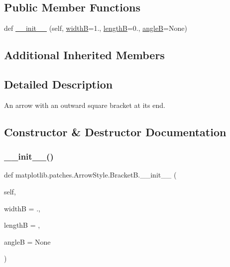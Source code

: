 \subsection*{Public Member Functions}
\begin{DoxyCompactItemize}
\item 
def \hyperlink{classmatplotlib_1_1patches_1_1ArrowStyle_1_1BracketB_a36e5298c1d28047970239880812fbf02}{\+\_\+\+\_\+init\+\_\+\+\_\+} (self, \hyperlink{classmatplotlib_1_1patches_1_1ArrowStyle_1_1__Bracket_a145f84316adeeaabbe60a5dea2281ddf}{widthB}=1., \hyperlink{classmatplotlib_1_1patches_1_1ArrowStyle_1_1__Bracket_a5fa143f40303b2b4cbcb4a24d233f735}{lengthB}=0., \hyperlink{classmatplotlib_1_1patches_1_1ArrowStyle_1_1__Bracket_ad57a9e23886fca6b0e6c632a509d947d}{angleB}=None)
\end{DoxyCompactItemize}
\subsection*{Additional Inherited Members}


\subsection{Detailed Description}
\begin{DoxyVerb}An arrow with an outward square bracket at its end.\end{DoxyVerb}
 

\subsection{Constructor \& Destructor Documentation}
\mbox{\label{classmatplotlib_1_1patches_1_1ArrowStyle_1_1BracketB_a36e5298c1d28047970239880812fbf02}} 
\subsubsection{\texorpdfstring{\+\_\+\+\_\+init\+\_\+\+\_\+()}{\_\_init\_\_()}}
{\footnotesize\ttfamily def matplotlib.\+patches.\+Arrow\+Style.\+Bracket\+B.\+\_\+\+\_\+init\+\_\+\+\_\+ (\begin{DoxyParamCaption}\item[{}]{self,  }\item[{}]{widthB = {.},  }\item[{}]{lengthB = {},  }\item[{}]{angleB = {\ttfamily None} }\end{DoxyParamCaption})}

